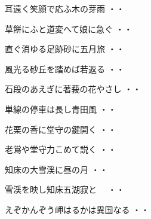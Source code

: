 \vspace{0.6cm}
\begin{shiika}耳遠く笑顔で応ふ木の芽雨
\hfill{・・}\end{shiika}
\vspace{0.6cm}
\begin{shiika}草餅にふと道変へて娘に急ぐ
\hfill{・・}\end{shiika}
\vspace{0.6cm}
\begin{shiika}直ぐ消ゆる足跡砂に五月旅
\hfill{・・}\end{shiika}
\vspace{0.6cm}
\begin{shiika}風光る砂丘を踏めば若返る
\hfill{・・}\end{shiika}
\vspace{0.6cm}
\begin{shiika}石段のあえぎに著莪の花やさし
\hfill{・・}\end{shiika}
\vspace{0.6cm}
\begin{shiika}単線の停車は長し青田風
\hfill{・・}\end{shiika}
\vspace{0.6cm}
\begin{shiika}花栗の香に堂守の鍵開く
\hfill{・・}\end{shiika}
\vspace{0.6cm}
\begin{shiika}老鴬や堂守力こめて説く
\hfill{・・}\end{shiika}
\vspace{0.6cm}
\begin{shiika}知床の大雪渓に昼の月
\hfill{・・}\end{shiika}
\vspace{0.6cm}
\begin{shiika}雪渓を映し知床五湖寂と　
\hfill{・・}\end{shiika}
\vspace{0.6cm}
\begin{shiika}えぞかんぞう岬はるかは異国なる
\hfill{・・}\end{shiika}
\vspace{0.6cm}
